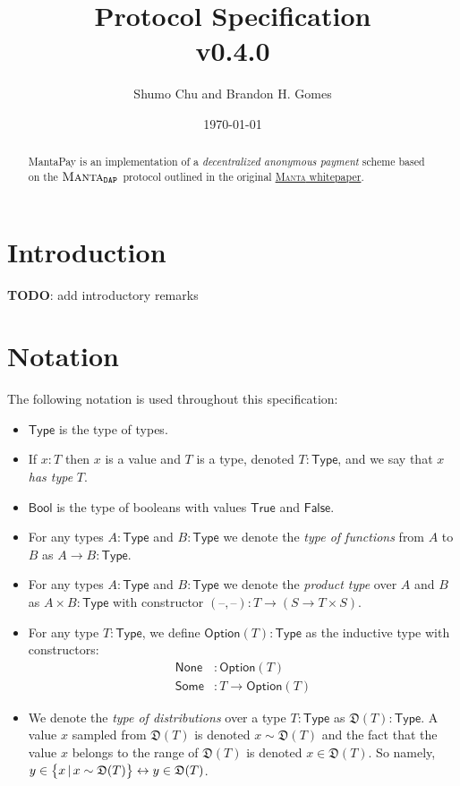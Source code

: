 \documentclass[a4paper]{article}
\title{\textbf{\MantaPay{} Protocol Specification}\\ v0.4.0}
\author{Shumo Chu and Brandon H. Gomes}
\date{\today}
\newcommand{\lsection}[2]{\def\sectionlabel{#2} \section{#1}\label{sec:#2}}
\newcommand{\TODO}[1]{{\color{red}\textbf{TODO}}: #1}
\theoremstyle{definition}
\newcommand{\dash}{{\textrm{--}}}
\newcommand{\Bool}{{\textsf{Bool}}}
\newcommand{\False}{{\textsf{False}}}
\newcommand{\MantaDAP}{{\Manta{}_{\texttt{DAP}}}}
\newcommand{\MantaPay}{{\textsf{MantaPay}}}
\newcommand{\Manta}{{\textsc{Manta}}}
\newcommand{\None}{{\textsf{None}}}
\newcommand{\Option}{{\textsf{Option}}}
\newcommand{\Some}{{\textsf{Some}}}
\newcommand{\True}{{\textsf{True}}}
\newcommand{\Type}{{\textsf{Type}}}
\begin{document}
    
\maketitle

\begin{abstract}
    \MantaPay{} is an implementation of a \emph{decentralized anonymous payment} scheme based on the $\MantaDAP$ protocol outlined in the original \href{https://eprint.iacr.org/2021/743.pdf}{\Manta{} whitepaper}.
\end{abstract}
    
\tableofcontents

\lsection{Introduction}{introduction}

\TODO{add introductory remarks}

\lsection{Notation}{notation}

The following notation is used throughout this specification:

\begin{itemize}
    \item $\Type$ is the type of types\footnotemark{}.
    \item If $x : T$ then $x$ is a value and $T$ is a type, denoted $T : \Type$, and we say that $x$ \emph{has type} $T$.
    \item $\Bool$ is the type of booleans with values $\True$ and $\False$.
    \item For any types $A : \Type$ and $B : \Type$ we denote the \emph{type of functions} from $A$ to $B$ as $A \to B : \Type$.
    \item For any types $A : \Type$ and $B : \Type$ we denote the \emph{product type} over $A$ and $B$ as $A \times B : \Type$ with constructor $(\dash, \dash) : T \to (S \to T \times S)$.
    \item For any type $T : \Type$, we define $\Option(T) : \Type$ as the inductive type with constructors:
        \begin{align*}
            \None &: \Option(T) \\
            \Some &: T \to \Option(T)
        \end{align*}
    \item We denote the \emph{type of distributions} over a type $T : \Type$ as $\mathfrak{D}(T) : \Type$. A value $x$ sampled from $\mathfrak{D}(T)$ is denoted $x \sim \mathfrak{D}(T)$ and the fact that the value $x$ belongs to the range of $\mathfrak{D}(T)$ is denoted $x \in \mathfrak{D}(T)$. So namely, $y \in \set{x \,|\, x \sim \mathfrak{D}(T)} \leftrightarrow y \in \mathfrak{D}(T)$.
\end{itemize}
\end{document}
